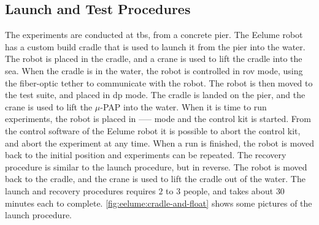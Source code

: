 \subsection*{Launch and Test Procedures}
The experiments are conducted at \gls{tbs}, from a concrete pier. The Eelume 
robot has a custom build cradle that is used to launch it from the pier into the water. The
robot is placed in the cradle, and a crane is used to lift the cradle into the sea.
When the cradle is in the water, the robot is controlled in \gls{rov} mode, using
the fiber-optic tether to communicate with the robot. The robot is then moved to the test suite,
and placed in \gls{dp} mode. The cradle is landed on the pier, and the crane is used to lift the
\(\mu\)-PAP into the water. When it is time to run experiments, the robot is placed in
----- mode and the control kit is started. From the control software of the Eelume
robot it is possible to abort the control kit, and abort the experiment at any time.
When a run is finished, the robot is moved back to the initial position and experiments can be repeated.
The recovery procedure is similar to the launch procedure, but in reverse. The robot
is moved back to the cradle, and the crane is used to lift the cradle out of the water.
The launch and recovery procedures requires \(2\) to \(3\) people, and takes about \(30\) minutes each to complete.
\autoref{fig:eelume:cradle-and-float} shows some pictures of the launch procedure.


